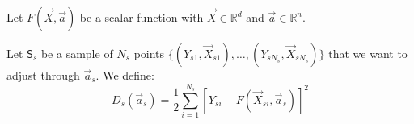 \documentclass[aps,12pt]{revtex4}
\begin{document}
Let $F(\vec{X},\vec{a})$ be a scalar function with $\vec{X} \in \mathbb{R}^d$ and $\vec{a}\in\mathbb{R}^n$.

Let $\mathsf{S}_s$ be a sample of $N_s$ points $\lbrace(Y_{s1},\vec{X}_{s1}),\ldots,(Y_{sN_s},\vec{X}_{sN_s})\rbrace$
that we want to adjust through $\vec{a}_s$.
We define:
\begin{equation}
	D_s(\vec{a}_s) = \dfrac{1}{2}\sum_{i=1}^{N_s} \left[ Y_{si} - F(\vec{X}_{si},\vec{a}_s)\right] ^2
\end{equation}
\end{document}
